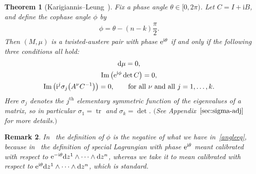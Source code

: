 \documentclass[pdftex]{sigma}
\def\ri{\mathrm{i}}
\renewcommand{\Im}{\operatorname{Im}}
\def\tr{\operatorname{tr}}
\newtheorem{Theorem}{Theorem}[section]
\newtheorem{Remark}[Theorem]{Remark}}
\numberwithin{equation}{section}
\begin{document}
\begin{Theorem}[Karigiannis--Leung~\cite{KL}] \label{theoremzero}
Fix a \emph{phase angle} $\theta \in [0, 2 \pi)$. Let $C=I + \ri B$, and define the \emph{cophase angle} $\phi$ by
\begin{gather} \label{angleeq}
\phi = \theta - (n-k) \dfrac{\pi}2.
\end{gather}
Then $(M, \mu)$ is a twisted-austere pair with phase ${\rm e}^{\ri \theta}$ if and only if the following three conditions all hold:
\begin{gather} \label{eq:tw1}
{\rm d}\mu = 0,
\\ \label{eq:tw2}
\Im \big({\rm e}^{\ri \phi} \det C \big) = 0,
\\ \label{eq:tw3}
\Im \big( \ri^j \sigma_j \big(A^\nu C^{-1} \big) \big) = 0, \qquad \text{for all $\nu$ and all $j=1, \dots, k$}.
\end{gather}
Here $\sigma_j$ denotes the $j^{\text{th}}$ elementary symmetric function of the eigenvalues of a matrix, so in particular $\sigma_1 = \tr$ and $\sigma_k = \det$. $($See Appendix~$\ref{sec:sigma-adj}$ for more details.$)$
\end{Theorem}

\begin{Remark}
In~\cite[Theorem 2.3]{KL} the definition of $\phi$ is the negative of what we have in~\eqref{angleeq}, because in~\cite{KL} the definition of special Lagrangian with phase ${\rm e}^{\ri \theta}$ meant calibrated with respect to ${\rm e}^{-\ri \theta} {\rm d}z^1 \wedge \cdots \wedge {\rm d}z^n$, whereas we take it to mean calibrated with respect to ${\rm e}^{\ri \theta} {\rm d}z^1 \wedge \cdots \wedge {\rm d}z^n$, which is standard.
\end{Remark}
\end{document}
